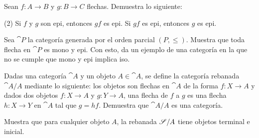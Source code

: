 \begin{exercise}
  Sean \(f\colon A\to B\) y \(g\colon B\to C\) flechas. Demuestra lo
  siguiente:
  \begin{tasks}(2)
      \task Si \(f\) y \(g\) son epi, entonces \(gf\) es epi.
      \task Si \(gf\) es epi, entonces \(g\) es epi.
  \end{tasks}
\end{exercise}

\begin{exercise}
  Sea \(\cat{P}\) la categoría generada por el orden parcial \((P,\leq)\).
  Muestra que toda flecha en \(\cat{P}\) es mono y epi. Con esto, da un
  ejemplo de una categoría en la que no se cumple que mono y epi implica iso.
\end{exercise}

\begin{exercise}
  Dadas una categoría \(\cat{A}\) y un objeto \(A\in\cat{A}\), se define
  la categoría rebanada  \(\cat{A}/A\) mediante lo siguiente: los objetos
  son flechas en \(\cat{A}\) de la forma \(f\colon X\to A\) y dados
  dos objetos \(f\colon X\to A\) y \(g\colon Y\to A\), una flecha de
  \(f\) a \(g\) es una flecha \(h\colon X\to Y\) en \(\cat{A}\) tal que
  \(g = hf\). Demuestra que \(\cat{A}/A\) es una categoría.
\end{exercise}

\begin{exercise}
  Muestra que para cualquier objeto \(A\), la rebanada \(\mathscr{S}/A\)
  tiene objetos terminal e inicial.
\end{exercise}


